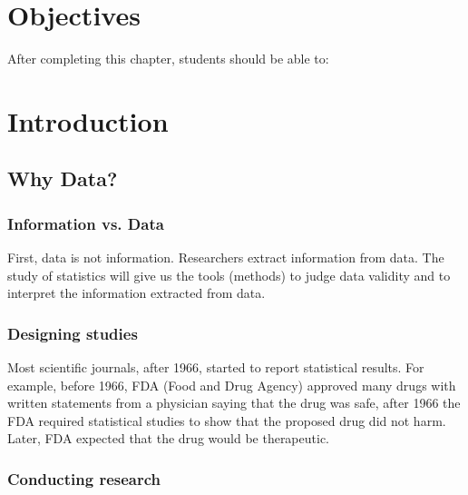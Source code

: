 \documentclass[11pt]{book}\usepackage[]{graphicx}\usepackage[]{color}
\begin{document}
\section{Objectives}

After completing this chapter, students should be able to:


\section{Introduction}

\subsection{Why Data?}

\subsubsection{Information vs. Data}

First, data is not information.  Researchers extract information from data.  The study of statistics will give us the tools (methods) to judge data validity and to interpret the information extracted from data.

\subsubsection{Designing studies}

Most scientific journals, after 1966, started to report statistical results.  For example, before 1966, FDA (Food and Drug Agency) approved many drugs with written statements from a physician saying that the drug was safe, after 1966 the FDA required statistical studies to show that the proposed drug did not harm.  Later, FDA expected that the drug would be therapeutic.

\subsubsection{Conducting research}
\end{document}
